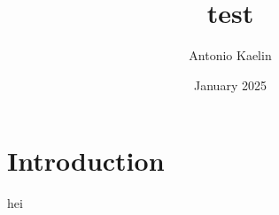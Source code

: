 \documentclass{article}
\title{test}
\author{Antonio Kaelin}
\date{January 2025}
\begin{document}
\maketitle

\section{Introduction}
hei
\end{document}
